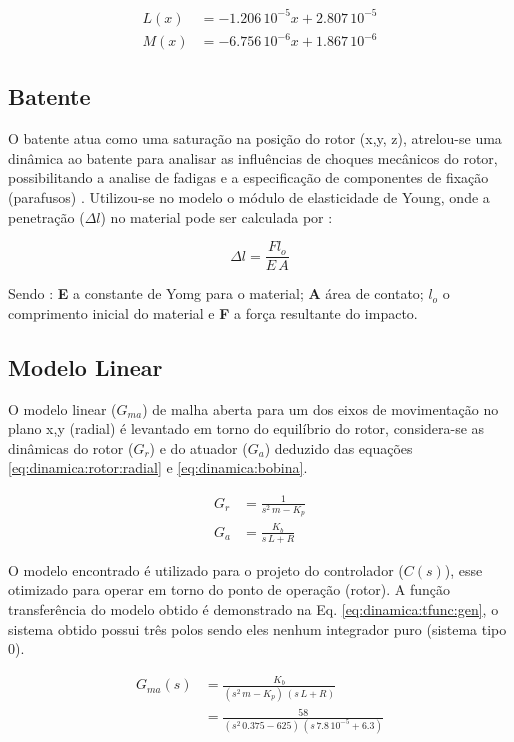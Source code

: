 \begin{align}
	L(x) &= -1.206 \,10^{-5} x + 2.807 \, 10^{-5} \\
	M(x) &= -6.756 \,10^{-6} x + 1.867 \, 10^{-6} 
	\label{eq:indutancias:aprox}
\end{align} 

\subsection{Batente}

O batente atua como uma saturação na posição do rotor (x,y, z), atrelou-se uma dinâmica ao batente para analisar as influências de choques mecânicos do rotor, possibilitando a analise de fadigas e a especificação de componentes de fixação (parafusos) . Utilizou-se no  modelo o módulo de elasticidade de Young, onde a penetração ($\Delta l $) no material pode ser calculada por :

\begin{equation}
	\Delta l =  \frac{F l_o}{E \, A}
\end{equation}

Sendo : \textbf{E }a constante de Yomg para o material; \textbf{A} área de contato; \textbf{$l_o$ } o comprimento inicial do material e \textbf{F} a força resultante do impacto. 


\subsection{Modelo Linear}

O modelo linear ($G_{ma}$) de malha aberta para um dos eixos de movimentação no plano x,y (radial) é levantado em torno do equilíbrio do rotor, considera-se as dinâmicas do rotor ($G_r$) e do atuador ($G_a$) deduzido das equações  \eqref{eq:dinamica:rotor:radial} e \eqref{eq:dinamica:bobina}.

\begin{align}
	G_r &= \frac{1}{s^2 \, m - K_p} \\
	G_a &= \frac{K_b}{s\, L + R}
\end{align}

O modelo encontrado é utilizado para o projeto do controlador ($C(s)$), esse otimizado para operar em torno do ponto de operação (rotor). A função transferência do modelo obtido é demonstrado na Eq. \eqref{eq:dinamica:tfunc:gen}, o sistema obtido possui três polos sendo eles nenhum integrador puro (sistema tipo 0).  

\begin{align}
	G_{ma}(s) &= \frac{K_b}{(s^2 \, m - K_p) \, (s\, L + R)}	\label{eq:dinamica:tfunc:gen} \\
	&= \frac{58}{(s^2 \, 0.375 - 625) \, (s\, 7.8 \, 10^{-5} + 6.3)}
	 \label{eq:dinamica:tfunc}
\end{align}
 

